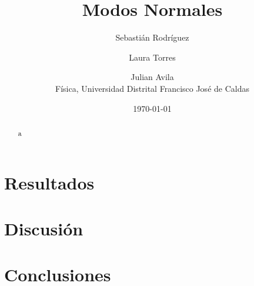 \documentclass[11pt]{article}
\title{\bfseries Modos Normales}
\author{
  Sebastián Rodríguez \and
  Laura Torres \and
  Julian Avila\\
  \normalsize Física, Universidad Distrital Francisco José de Caldas
}
\date{\today}
\begin{document}
\maketitle

\begin{abstract}
a
\end{abstract}




\section{Resultados}
\label{sec:Resultados}

\section{Discusión}
\label{sec:Discusión}

\section{Conclusiones}
\label{sec:Conclusiones}
\end{document}
